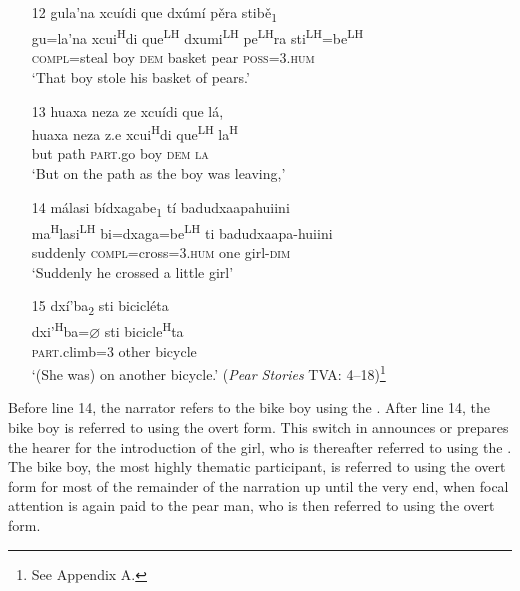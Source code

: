 \begin{itemize}
\item[12]
\glll gula'na xcu\'{i}di que dx\'{u}m\'{i} p\v{e}ra stib\v{e}\textsubscript{1} \\
gu=la'na xcui\textsuperscript{H}di que\textsuperscript{LH} dxumi\textsuperscript{LH} pe\textsuperscript{LH}ra sti\textsuperscript{LH}=be\textsuperscript{LH}  \\
\textsc{compl}=steal boy \textsc{dem} basket pear \textsc{poss}=\textsc{3.hum} \\
\glt `That boy stole his basket of pears.'


\item[13]
\glll huaxa neza ze xcu\'{i}di que l\'{a}, \\
huaxa neza z.e xcui\textsuperscript{H}di que\textsuperscript{LH} la\textsuperscript{H} \\
but path \textsc{part}.go boy \textsc{dem} \textsc{la} \\
\glt `But on the path as the boy was leaving,'


\item[14]
\glll m\'{a}lasi b\'{i}dxagabe\textsubscript{1} t\'{i} badudxaapahuiini \\
ma\textsuperscript{H}lasi\textsuperscript{LH} bi=dxaga=be\textsuperscript{LH}  ti badudxaapa-huiini \\
suddenly \textsc{compl}=cross=\textsc{3.hum} one girl-\textsc{dim} \\
\glt `Suddenly he crossed a little girl'


\item[15]
\glll dx\'{i}'ba\textsubscript{2} sti bicicl\'{e}ta \\
dxi'\textsuperscript{H}ba={$\varnothing$} sti bicicle\textsuperscript{H}ta \\
\textsc{part}.climb=\textsc{3} other bicycle \\
\glt `(She was) on another bicycle.' \hfill{(\textit{Pear Stories} TVA: 4--18)\footnote{See Appendix A.}}

\end{itemize}
\z

Before line 14, the narrator refers to the bike boy using the . After line 14, the bike boy is referred to using the overt form. This switch in  announces or prepares the hearer for the introduction of the girl, who is thereafter referred to using the . The bike boy, the most highly thematic participant, is referred to using the overt form for most of the remainder of the narration up until the very end, when focal attention is again paid to the pear man, who is then referred to using the overt form.

